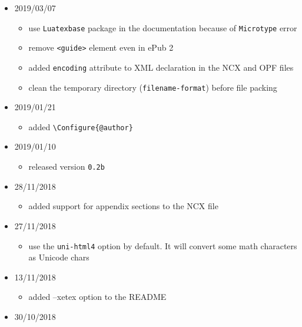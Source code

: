 \begin{itemize}
  \begin{itemize}
  \tightlist
  \item
    released version \texttt{0.2c}
  \end{itemize}
\item
  2019/03/07

  \begin{itemize}
  \tightlist
  \item
    use \texttt{Luatexbase} package in the documentation because of
    \texttt{Microtype} error
  \item
    remove \texttt{\textless{}guide\textgreater{}} element even in ePub
    2
  \item
    added \texttt{encoding} attribute to XML declaration in the NCX and
    OPF files
  \item
    clean the temporary directory (\texttt{filename-format}) before file
    packing
  \end{itemize}
\item
  2019/01/21

  \begin{itemize}
  \tightlist
  \item
    added \texttt{\textbackslash{}Configure\{@author\}}
  \end{itemize}
\item
  2019/01/10

  \begin{itemize}
  \tightlist
  \item
    released version \texttt{0.2b}
  \end{itemize}
\item
  28/11/2018

  \begin{itemize}
  \tightlist
  \item
    added support for appendix sections to the NCX file
  \end{itemize}
\item
  27/11/2018

  \begin{itemize}
  \tightlist
  \item
    use the \texttt{uni-html4} option by default. It will convert some
    math characters as Unicode chars
  \end{itemize}
\item
  13/11/2018

  \begin{itemize}
  \tightlist
  \item
    added --xetex option to the README
  \end{itemize}
\item
  30/10/2018


\end{itemize}
